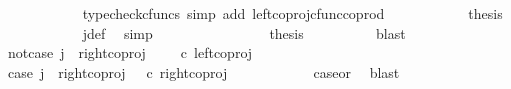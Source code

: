 \begin{isabellebody}
\ \ \ \ \ \ \ \ \ \ \isamarkupfalse%
\ {\isacharparenleft}{\kern0pt}typecheck{\isacharunderscore}{\kern0pt}cfuncs{\isacharcomma}{\kern0pt}\ simp\ add{\isacharcolon}{\kern0pt}\ left{\isacharunderscore}{\kern0pt}coproj{\isacharunderscore}{\kern0pt}cfunc{\isacharunderscore}{\kern0pt}coprod{\isacharparenright}{\kern0pt}\isanewline
\ \ \ \ \ \ \ \ \isamarkupfalse%
\ \isamarkupfalse%
\ {\isacharquery}{\kern0pt}thesis\isanewline
\ \ \ \ \ \ \ \ \ \ \isamarkupfalse%
\ j{\isacharunderscore}{\kern0pt}def\ \isamarkupfalse%
\ simp\isanewline
\ \ \ \ \ \ \isamarkupfalse%
\isanewline
\ \ \ \ \ \ \isamarkupfalse%
\ \isamarkupfalse%
\ {\isacharquery}{\kern0pt}thesis\isanewline
\ \ \ \ \ \ \ \ \isamarkupfalse%
\ blast\isanewline
\ \ \ \ \isamarkupfalse%
\isanewline
\ \ \ \ \ \ \isamarkupfalse%
\ not{\isacharunderscore}{\kern0pt}case{}{\isacharcolon}{\kern0pt}\ {\isachardoublequoteopen}j\ {\isasymnoteq}\ right{\isacharunderscore}{\kern0pt}coproj\ {\isasymone}\ {\isacharparenleft}{\kern0pt}{\isasymone}\ {\isasymCoprod}\ {\isasymone}{\isacharparenright}{\kern0pt}\ {\isasymcirc}\isactrlsub c\ left{\isacharunderscore}{\kern0pt}coproj\ {\isasymone}\ {\isasymone}{\isachardoublequoteclose}\isanewline
\ \ \ \ \ \ \isamarkupfalse%
\ \isamarkupfalse%
\ case{}{\isacharcolon}{\kern0pt}\ {\isachardoublequoteopen}j\ {\isacharequal}{\kern0pt}\ right{\isacharunderscore}{\kern0pt}coproj\ {\isasymone}\ {\isacharparenleft}{\kern0pt}{\isasymone}{\isasymCoprod}{\isasymone}{\isacharparenright}{\kern0pt}\ {\isasymcirc}\isactrlsub c\ right{\isacharunderscore}{\kern0pt}coproj\ {\isasymone}\ {\isasymone}{\isachardoublequoteclose}\isanewline
\ \ \ \ \ \ \ \ \isamarkupfalse%
\ case{}{\isacharunderscore}{\kern0pt}or{\isacharunderscore}{\kern0pt}{}\ \isamarkupfalse%
\ blast\isanewline
\ \ \ \ \ \ \isamarkupfalse%
\ {\isachardoublequoteopen}{\isasymlangle}{\isasymf}{\isacharcomma}{\kern0pt}\ {\isasymt}{\isasymrangle}\ {\isacharequal}{\kern0pt}\ {\isasymlangle}{\isasymt}{\isacharcomma}{\kern0pt}{\isasymt}{\isasymrangle}{\isachardoublequoteclose}\isanewline
\ \ \ \ \ \ \isamarkupfalse%
\ {\isacharminus}{\kern0pt}\ \isanewline
\ \ \ \ \ \ \ \ \isamarkupfalse%

\end{isabellebody}
